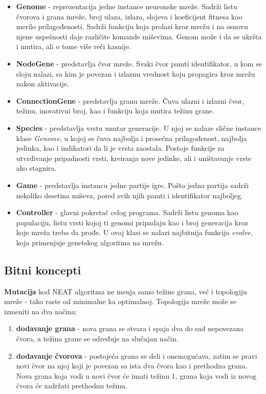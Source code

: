 \documentclass[a4paper]{article}
\begin{document}
\begin{itemize}

\item \textbf{Genome} - reprezentacija jedne instance neuronske mreže. Sadrži listu čvorova i grana mreže, broj ulaza, izlaza, slojeva i koeficijent fitnesa kao merilo prilagođenosti. Sadrži funkciju koja prolazi kroz mrežu i na osnovu njene uspešnosti daje različite komande miševima. Genom može i da se ukršta i mutira, ali o tome više reči kasnije.

\item \textbf{NodeGene} - predstavlja čvor mreže. Svaki čvor pamti identifikator, u kom se sloju nalazi, sa kim je povezan i izlaznu vrednost koju propagira kroz mrežu nakon aktivacije.

\item \textbf{ConnectionGene} - predstavlja granu mreže. Čuva ulazni i izlazni čvor, težinu, inovativni broj, kao i funkciju koja mutira težinu grane.

\item \textbf{Species} - predstavlja vrstu unutar generacije. U njoj se nalaze slične instance klase \emph{Genome}, u kojoj se čuva najbolja i prosečna prilagođenost, najbolja jedinka, kao i indikatori da li je vrsta zaostala. Postoje funkcije za utvrđivanje pripadnosti vrsti, kreiranja nove jedinke, ali i uništavanje vrste ako stagnira.

\item \textbf{Game} - predstavlja instancu jedne partije igre. Pošto jedna partija sadrži nekoliko desetina miševa, pored svih njih pamti i identifikator najboljeg.

\item \textbf{Controller} - glavni pokretač celog programa. Sadrži listu genoma kao populaciju, listu vrsti kojoj ti genomi pripadaju kao i broj generacija kroz koje mreža treba da prođe. U ovoj klasi se nalazi najbitnija funkcija \emph{evolve}, koja primenjuje genetskog algoritma na mrežu.

\end{itemize}

\subsection{Bitni koncepti}

\textbf{Mutacija} kod NEAT algoritma ne menja samo težine grana, već i topologiju mreže - tako raste od minimalne ka optimalnoj. Topologija mreže može se izmeniti na dva načina:
\begin{enumerate}[topsep=1pt, itemsep=-1ex, partopsep=1ex, parsep=1ex]
\item \textbf{dodavanje grana} - nova grana se stvara i spaja dva do sad nepovezana čvora, a težina grane se određuje na slučajan način.
\item \textbf{dodavanje čvorova} - postojeća grana se deli i onemogućava, zatim se pravi novi čvor na njoj koji je povezan sa ista dva čvora kao i prethodna grana. Nova grana koja vodi u novi čvor će imati težinu 1, grana koja vodi iz novog čvora će zadržati prethodnu težinu.
\end{enumerate}
\end{document}
